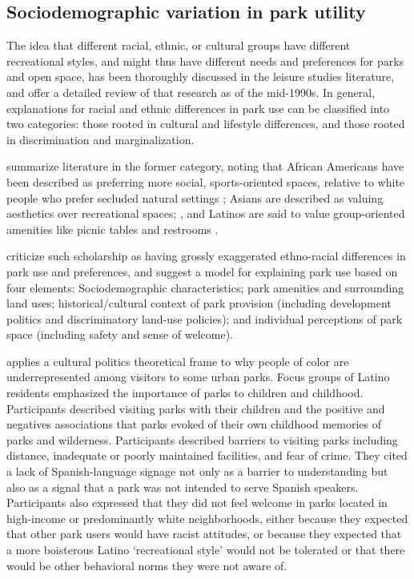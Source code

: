 \documentclass[3p, authoryear]{elsarticle} %
\begin{document}
\hypertarget{sociodemographic-variation-in-park-utility}{%
\subsection{Sociodemographic variation in park utility}\label{sociodemographic-variation-in-park-utility}}

The idea that different racial, ethnic, or cultural groups have different
recreational styles, and might thus have different needs and preferences for
parks and open space, has been thoroughly discussed in the leisure studies
literature, and \citet{husbands1995ethnicity} offer a detailed review of that research
as of the mid-1990s. In general, explanations for racial and ethnic differences
in park use can be classified into two categories: those rooted in cultural and
lifestyle differences, and those rooted in discrimination and marginalization.

\citet{byrne2009nature} summarize literature in the former category, noting that
African Americans have been described as preferring more social,
sports-oriented spaces, relative to white people who prefer secluded natural
settings \citep{washburne1978black, hutchison1987ethnicity, floyd1999convergence, gobster2002managing, payne2002examination, ho2005gender}; Asians are
described as valuing aesthetics over recreational spaces;
\citep{gobster2002managing, payne2002examination, ho2005gender}, and Latinos are
said to value group-oriented amenities like picnic tables and restrooms
\citep{baas1993influence, hutchison1987ethnicity, irwin1990mexican}.

\citet{byrne2009nature} criticize such scholarship as having grossly exaggerated
ethno-racial differences in park use and preferences, and suggest a model for
explaining park use based on four elements: Sociodemographic characteristics;
park amenities and surrounding land uses; historical/cultural context of park
provision (including development politics and discriminatory land-use
policies); and individual perceptions of park space (including safety and
sense of welcome).

\citet{byrne2012green} applies a cultural politics theoretical frame to why people of
color are underrepresented among visitors to some urban parks. Focus groups of
Latino residents emphasized the importance of parks to children and childhood.
Participants described visiting parks with their children and the positive and
negatives associations that parks evoked of their own childhood memories of
parks and wilderness. Participants described barriers to visiting parks
including distance, inadequate or poorly maintained facilities, and fear of
crime. They cited a lack of Spanish-language signage not only as a barrier to
understanding but also as a signal that a park was not intended to serve
Spanish speakers. Participants also expressed that they did not feel welcome
in parks located in high-income or predominantly white neighborhoods, either
because they expected that other park users would have racist attitudes, or
because they expected that a more boisterous Latino `recreational style' would
not be tolerated or that there would be other behavioral norms they were not
aware of.
\end{document}
